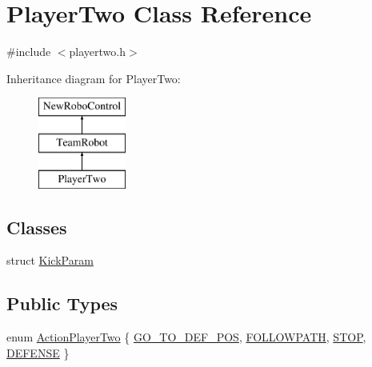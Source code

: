 \hypertarget{classPlayerTwo}{
\section{PlayerTwo Class Reference}
\label{classPlayerTwo}
}


{\ttfamily \#include $<$playertwo.h$>$}

Inheritance diagram for PlayerTwo:\begin{figure}[H]
\begin{center}
\leavevmode
\includegraphics[height=3cm]{classPlayerTwo}
\end{center}
\end{figure}
\subsection*{Classes}
\begin{DoxyCompactItemize}
\item 
struct \hyperlink{structPlayerTwo_1_1KickParam}{KickParam}
\end{DoxyCompactItemize}
\subsection*{Public Types}
\begin{DoxyCompactItemize}
\item 
enum \hyperlink{classPlayerTwo_a6dd2b1afb179fe02b677dd71ec5703d2}{ActionPlayerTwo} \{ \hyperlink{classPlayerTwo_a6dd2b1afb179fe02b677dd71ec5703d2a1ee0927d53a79a9c07f3e8347b65ec6e}{GO\_\-TO\_\-DEF\_\-POS}, 
\hyperlink{classPlayerTwo_a6dd2b1afb179fe02b677dd71ec5703d2abd5fef2f14d18f78f33c6e946f1c9cd7}{FOLLOWPATH}, 
\hyperlink{classPlayerTwo_a6dd2b1afb179fe02b677dd71ec5703d2aebb0cbac0bcb8fb7439a980dcc792638}{STOP}, 
\hyperlink{classPlayerTwo_a6dd2b1afb179fe02b677dd71ec5703d2a891b5407c8423ecb7d65df3a7da9b334}{DEFENSE}
 \}
\end{DoxyCompactItemize}
